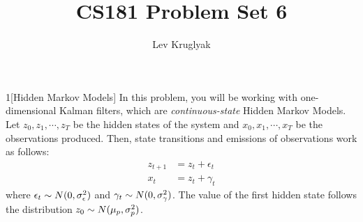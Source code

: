 \documentclass[expanded]{lkx_pset}
\title{CS181 Problem Set 6}
\author{Lev Kruglyak}
\begin{document}
\maketitle

\begin{problem}{1}[Hidden Markov Models]
In this problem, you will be working with one-dimensional Kalman filters, which are \textit{continuous-state} Hidden Markov Models. Let $z_0, z_1, \cdots , z_T$ be the hidden states of the system and $x_0, x_1, \cdots, x_T$ be the observations produced. Then, state transitions and emissions of observations work as follows:
\begin{eqnarray*}
	z_{t+1} &= z_{t} + \epsilon_{t} \\
	x_{t} & = z_{t} + \gamma_{t}
\end{eqnarray*}
where $\epsilon_t \sim N(0,\sigma_{\epsilon}^2)$ and $\gamma_t \sim N(0,\sigma_{\gamma}^2)$. The value of the first hidden state follows the distribution $z_0 \sim N(\mu_{p},\sigma_{p}^2)$.
\end{problem}
\end{document}
